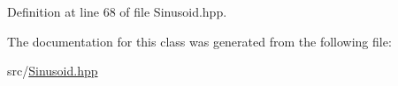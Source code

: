 Definition at line 68 of file Sinusoid.\+hpp.



The documentation for this class was generated from the following file\+:\begin{DoxyCompactItemize}
\item 
src/\hyperlink{Sinusoid_8hpp}{Sinusoid.\+hpp}\end{DoxyCompactItemize}
